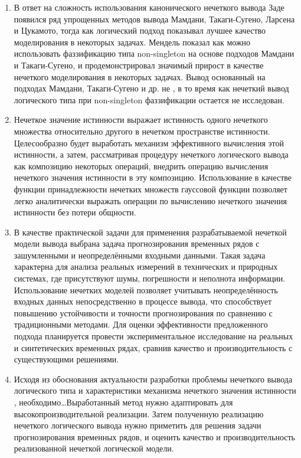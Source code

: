 \begin{enumerate}
	\item В ответ на сложность использования канонического нечеткого вывода Заде появился ряд упрощенных методов вывода Мамдани, Такаги-Сугено, Ларсена и Цукамото, тогда как логический подход показывал лучшее качество моделирования в некоторых задачах. Мендель показал как можно использовать фаззификацию типа non-singleton на основе подходов Мамдани и Такаги-Сугено, и продемонстрировал значимый прирост в качестве нечеткого моделирования в некоторых задачах. Вывод основанный на подходах Мамдани, Такаги-Сугено и др. не , в то время как нечеткий вывод логического типа при non-singleton фаззификации остается не исследован.
	\item Нечеткое значение истинности выражает истинность одного нечеткого множества относительно другого в нечетком пространстве истинности. Целесообразно будет выработать механизм эффективного вычисления этой истинности, а затем, рассматривая процедуру нечеткого логического вывода как композицию некоторых операций, внедрить операцию вычисления нечеткого значения истинности в эту композицию. Использование в качестве функции принадлежности нечетких множеств гауссовой функции позволяет легко аналитически выражать операции по вычислению нечеткого значения истинности без потери общности.
    \item В качестве практической задачи для применения разрабатываемой нечеткой модели вывода выбрана задача прогнозирования временных рядов с зашумленными и неопределёнными входными данными. Такая задача характерна для анализа реальных измерений в технических и природных системах, где присутствуют шумы, погрешности и неполнота информации. Использование нечетких моделей позволяет учитывать неопределённость входных данных непосредственно в процессе вывода, что способствует повышению устойчивости и точности прогнозирования по сравнению с традиционными методами. Для оценки эффективности предложенного подхода планируется провести экспериментальное исследование на реальных и синтетических временных рядах, сравнив качество и производительность с существующими решениями.
	\item Исходя из обоснования актуальности разработки проблемы нечеткого вывода логического типа и характеристики механизма нечеткого значения истинности , необходимо\dots Выработанный метод нужно адаптировать для высокопроизводительной реализации. Затем полученную реализацию нечеткого логического вывода нужно приметить для решения задачи прогнозирования временных рядов, и оценить качество и производительность реализованной нечеткой логической модели.
\end{enumerate}

\FloatBarrier
